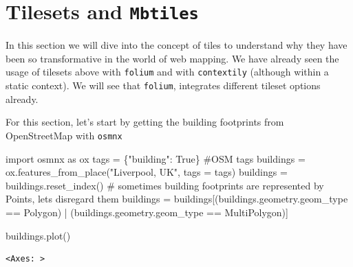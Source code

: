 \documentclass[
  letterpaper,
  DIV=11,
  numbers=noendperiod]{scrreprt}
\newenvironment{Shaded}{\begin{snugshade}}{\end{snugshade}}
\newcommand{\CommentTok}[1]{\textcolor[rgb]{0.37,0.37,0.37}{#1}}
\newcommand{\ImportTok}[1]{\textcolor[rgb]{0.00,0.46,0.62}{#1}}
\newcommand{\NormalTok}[1]{\textcolor[rgb]{0.00,0.23,0.31}{#1}}
\newcommand{\OperatorTok}[1]{\textcolor[rgb]{0.37,0.37,0.37}{#1}}
\newcommand{\StringTok}[1]{\textcolor[rgb]{0.13,0.47,0.30}{#1}}
\newcommand{\VariableTok}[1]{\textcolor[rgb]{0.07,0.07,0.07}{#1}}
\begin{document}
\hypertarget{tilesets-and-mbtiles}{%
\section{\texorpdfstring{Tilesets and
\texttt{Mbtiles}}{Tilesets and Mbtiles}}\label{tilesets-and-mbtiles}}

In this section we will dive into the concept of tiles to understand why
they have been so transformative in the world of web mapping. We have
already seen the usage of tilesets above with \texttt{folium} and with
\texttt{contextily} (although within a static context). We will see that
\texttt{folium}, integrates different tileset options already.

For this section, let's start by getting the building footprints from
OpenStreetMap with \texttt{osmnx}

\begin{Shaded}
\begin{Highlighting}[]
\ImportTok{import}\NormalTok{ osmnx }\ImportTok{as}\NormalTok{ ox}
\NormalTok{tags }\OperatorTok{=}\NormalTok{ \{}\StringTok{"building"}\NormalTok{: }\VariableTok{True}\NormalTok{\} }\CommentTok{\#OSM tags}
\NormalTok{buildings }\OperatorTok{=}\NormalTok{ ox.features\_from\_place(}\StringTok{"Liverpool, UK"}\NormalTok{, tags }\OperatorTok{=}\NormalTok{ tags) }
\NormalTok{buildings }\OperatorTok{=}\NormalTok{ buildings.reset\_index()}
 \CommentTok{\# sometimes building footprints are represented by Points, let\textquotesingle{}s disregard them}
\NormalTok{buildings }\OperatorTok{=}\NormalTok{ buildings[(buildings.geometry.geom\_type }\OperatorTok{==} \StringTok{\textquotesingle{}Polygon\textquotesingle{}}\NormalTok{) }\OperatorTok{|}\NormalTok{ (buildings.geometry.geom\_type }\OperatorTok{==} \StringTok{\textquotesingle{}MultiPolygon\textquotesingle{}}\NormalTok{)]}
\end{Highlighting}
\end{Shaded}

\begin{Shaded}
\begin{Highlighting}[]
\NormalTok{buildings.plot()}
\end{Highlighting}
\end{Shaded}

\begin{verbatim}
<Axes: >
\end{verbatim}
\end{document}
